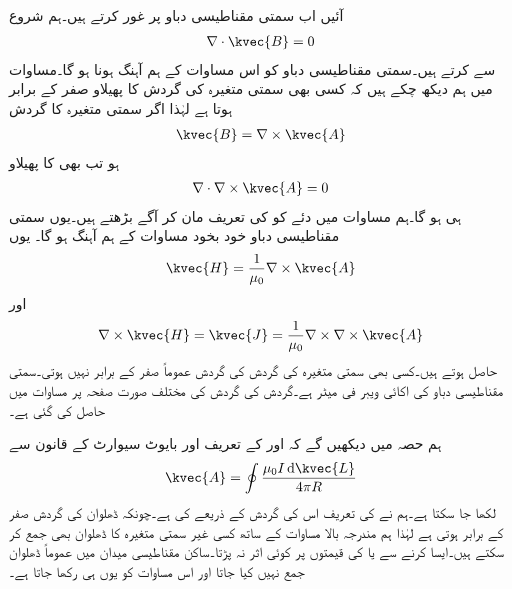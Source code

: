 
آئیں اب سمتی مقناطیسی دباو پر غور کرتے ہیں۔ہم شروع
\begin{align}\label{مساوات_مقناطیسی_پھیلاو_بہاو_صفر_ہے}
\nabla \cdot \kvec{B}=0
\end{align}
سے کرتے ہیں۔سمتی مقناطیسی دباو کو اس مساوات کے ہم آہنگ ہونا ہو گا۔مساوات  میں ہم دیکھ چکے ہیں کہ کسی بھی سمتی متغیرہ کی گردش کا پھیلاو صفر کے برابر ہوتا ہے لہٰذا اگر  سمتی متغیرہ  کا گردش
\begin{align}\label{مساوات_مقناطیسی_سمتی_دباو_تعریف}
\kvec{B}=\nabla \times \kvec{A}
\end{align}
 ہو تب بھی  کا پھیلاو
\begin{align*}
\nabla \cdot \nabla \times \kvec{A}=0
\end{align*}
ہی ہو گا۔ہم مساوات  میں دئے  کو  کی تعریف مان کر آگے بڑھتے ہیں۔یوں سمتی مقناطیسی دباو خود بخود مساوات  کے ہم آہنگ ہو گا۔  یوں
\begin{align*}
\kvec{H}=\frac{1}{\mu_0} \nabla \times \kvec{A}
\end{align*}
اور
\begin{align*}
\nabla \times \kvec{H}=\kvec{J}=\frac{1}{\mu_0} \nabla \times \nabla \times \kvec{A}
\end{align*}
حاصل ہوتے ہیں۔کسی بھی سمتی متغیرہ کی گردش کی گردش عموماً صفر کے برابر نہیں ہوتی۔سمتی مقناطیسی دباو  کی اکائی ویبر فی میٹر  ہے۔گردش کی گردش کی  مختلف صورت صفحہ  پر مساوات  میں حاصل کی گئی ہے۔

ہم حصہ  میں دیکھیں گے کہ  اور  کے تعریف اور بایوٹ سیوارٹ کے قانون سے
\begin{align}\label{مساوات_مقناطیسی_سمتی_دباو}
\kvec{A}=\oint \frac{\mu_0 I \dif \kvec{L}}{4\pi R}
\end{align}
لکھا جا سکتا ہے۔ہم نے  کی تعریف اس کی گردش کے ذریعے کی ہے۔چونکہ ڈھلوان کی گردش صفر کے برابر ہوتی ہے  لہٰذا ہم مندرجہ بالا مساوات کے ساتھ کسی غیر سمتی متغیرہ کا ڈھلوان بھی جمع کر سکتے ہیں۔ایسا کرنے سے  یا  کی قیمتوں پر کوئی اثر نہ پڑتا۔ساکن مقناطیسی میدان میں عموماً ڈھلوان جمع نہیں کیا جاتا اور اس مساوات کو یوں ہی رکھا جاتا ہے۔

